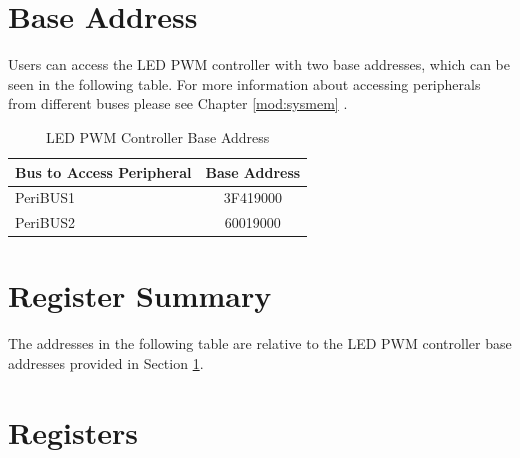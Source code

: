 \documentclass[main\_\_EN.tex]{subfiles}
\begin{document}
\section{Base Address}\label{subsection:ledc_base_address}
Users can access the LED PWM controller with two base addresses, which can be seen in the following table. For more information about accessing peripherals from different buses please see Chapter \ref{mod:sysmem} \textit{}.

\begin{longtable}[c]{ |l|c| }
\caption{LED PWM Controller Base Address} \label{table:ledc base address}
\\ \hline
\rowcolor{lightgray}
    Bus to Access Peripheral  &  Base Address\\
    \hline
    PeriBUS1 & \hexprefix{}3F419000 \\\hline
    PeriBUS2 & \hexprefix{}60019000 \\\hline
\end{longtable}

\hypertarget{ledpwm-reg-summ}{}
\section{Register Summary}

The addresses in the following table are relative to the LED PWM controller base addresses provided in Section \ref{subsection:ledc_base_address}.

{\clearpage}
\section{Registers}

\end{document}
